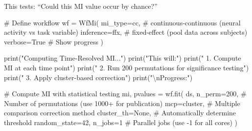 \documentclass[
  11pt,
  letterpaper,
  oneside,
  openany]{book}
\newenvironment{Shaded}{\begin{snugshade}}{\end{snugshade}}
\newcommand{\BuiltInTok}[1]{\textcolor[rgb]{0.00,0.23,0.31}{#1}}
\newcommand{\CharTok}[1]{\textcolor[rgb]{0.13,0.47,0.30}{#1}}
\newcommand{\CommentTok}[1]{\textcolor[rgb]{0.37,0.37,0.37}{#1}}
\newcommand{\DecValTok}[1]{\textcolor[rgb]{0.68,0.00,0.00}{#1}}
\newcommand{\NormalTok}[1]{\textcolor[rgb]{0.00,0.23,0.31}{#1}}
\newcommand{\OperatorTok}[1]{\textcolor[rgb]{0.37,0.37,0.37}{#1}}
\newcommand{\StringTok}[1]{\textcolor[rgb]{0.13,0.47,0.30}{#1}}
\newcommand{\VariableTok}[1]{\textcolor[rgb]{0.07,0.07,0.07}{#1}}
\begin{document}
This tests: ``Could this MI value occur by chance?''

\begin{Shaded}
\begin{Highlighting}[]
\CommentTok{\# Define workflow}
\NormalTok{wf }\OperatorTok{=}\NormalTok{ WfMi(}
\NormalTok{    mi\_type}\OperatorTok{=}\StringTok{\textquotesingle{}cc\textquotesingle{}}\NormalTok{,      }\CommentTok{\# continuous{-}continuous (neural activity vs task variable)}
\NormalTok{    inference}\OperatorTok{=}\StringTok{\textquotesingle{}ffx\textquotesingle{}}\NormalTok{,   }\CommentTok{\# fixed{-}effect (pool data across subjects)}
\NormalTok{    verbose}\OperatorTok{=}\VariableTok{True}       \CommentTok{\# Show progress}
\NormalTok{)}

\BuiltInTok{print}\NormalTok{(}\StringTok{"Computing Time{-}Resolved MI..."}\NormalTok{)}
\BuiltInTok{print}\NormalTok{(}\StringTok{"This will:"}\NormalTok{)}
\BuiltInTok{print}\NormalTok{(}\StringTok{"  1. Compute MI at each time point"}\NormalTok{)}
\BuiltInTok{print}\NormalTok{(}\StringTok{"  2. Run 200 permutations for significance testing"}\NormalTok{)}
\BuiltInTok{print}\NormalTok{(}\StringTok{"  3. Apply cluster{-}based correction"}\NormalTok{)}
\BuiltInTok{print}\NormalTok{(}\StringTok{"}\CharTok{\textbackslash{}n}\StringTok{Progress:"}\NormalTok{)}

\CommentTok{\# Compute MI with statistical testing}
\NormalTok{mi, pvalues }\OperatorTok{=}\NormalTok{ wf.fit(}
\NormalTok{    ds,}
\NormalTok{    n\_perm}\OperatorTok{=}\DecValTok{200}\NormalTok{,         }\CommentTok{\# Number of permutations (use 1000+ for publication)}
\NormalTok{    mcp}\OperatorTok{=}\StringTok{\textquotesingle{}cluster\textquotesingle{}}\NormalTok{,      }\CommentTok{\# Multiple comparison correction method}
\NormalTok{    cluster\_th}\OperatorTok{=}\VariableTok{None}\NormalTok{,    }\CommentTok{\# Automatically determine threshold}
\NormalTok{    random\_state}\OperatorTok{=}\DecValTok{42}\NormalTok{,}
\NormalTok{    n\_jobs}\OperatorTok{=}\DecValTok{1}            \CommentTok{\# Parallel jobs (use {-}1 for all cores)}
\NormalTok{)}


\end{Highlighting}
\end{Shaded}
\end{document}
